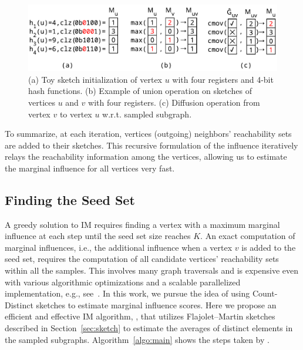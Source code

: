 \documentclass[final,5p,times,twocolumn]{elsarticle}
\newcommand\acro{{\sc{HyperFuseR\xspace}\xspace}\xspace}
\newcommand\kktodo[1]{\textcolor{red}{#1}}
\newcommand\ggx[1]{\textcolor{blue}{#1}}
\begin{document}

\begin{figure}[!ht]
    \begin{center}
    \includegraphics[width=0.8\linewidth]{images/fmops.pdf}
    \caption{ (a) \label{fminit} Toy sketch initialization of vertex $u$ with four registers and 4-bit hash functions. (b) \label{fmmerge} Example of union operation on sketches of vertices $u$ and $v$ with four registers. (c) \label{fmwrite} Diffusion operation from vertex $v$ to vertex $u$ w.r.t. sampled subgraph. 
     }\label{fig:fmops} 
    \end{center}
\end{figure}

To summarize, at each iteration, vertices (outgoing) neighbors' reachability sets are added to their sketches.
This recursive formulation of the influence iteratively relays the reachability information among the vertices, allowing us to estimate the marginal influence for all vertices very fast.

\subsection{Finding the Seed Set}
A greedy solution to IM requires finding a vertex with a maximum marginal influence at each step until the seed set size reaches $K$.
An exact computation of marginal influences, i.e., the additional influence when a vertex $v$ is added to the seed set, requires the computation of all candidate vertices' reachability sets within all the samples. This involves many graph traversals and is expensive even with various algorithmic optimizations and a scalable parallelized implementation, e.g., see~\cite{infuser}. %
In this work, we pursue the idea of using Count-Distinct sketches to estimate marginal influence scores. Here we propose an efficient and effective IM algorithm, \acro, that utilizes Flajolet–Martin sketches described in Section~\ref{sec:sketch} to estimate the averages of distinct elements in the sampled subgraphs. Algorithm~\ref{algo:main} shows the steps taken by \acro.
\end{document}
